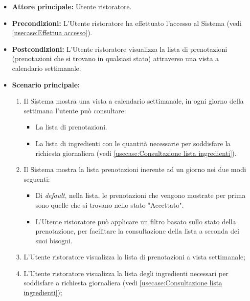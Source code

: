 \label{usecase:Consultazione lista prenotazioni}
\begin{itemize}
	\item \textbf{Attore principale:} Utente ristoratore.

	\item \textbf{Precondizioni:} L'Utente ristoratore ha effettuato l'accesso al Sistema (vedi \autoref{usecase:Effettua accesso}).

	\item \textbf{Postcondizioni:} L'Utente ristoratore visualizza la lista di prenotazioni (prenotazioni che si trovano in qualsiasi stato) attraverso una vista a calendario settimanale.

	\item \textbf{Scenario principale:}
	      \begin{enumerate}
		      \item Il Sistema mostra una vista a calendario settimanale, in ogni giorno della settimana l'utente può consultare:
		      \begin{itemize}
				\item La lista di prenotazioni.
				\item La lista di ingredienti con le quantità necessarie per soddisfare la richiesta giornaliera (vedi \autoref{usecase:Consultazione lista ingredienti}).
			  \end{itemize} 

		      \item Il Sistema mostra la lista prenotazioni inerente ad un giorno nei due modi seguenti:
		      \begin{itemize}
				\item Di \textit{default}, nella lista, le prenotazioni che vengono mostrate per prima sono quelle che si trovano nello stato "Accettato".
				\item L'Utente ristoratore può applicare un filtro basato sullo stato della prenotazione, per facilitare la consultazione della lista a seconda dei suoi bisogni.
			  \end{itemize}

		      \item L'Utente ristoratore visualizza la lista di prenotazioni a vista settimanale;

		      \item L'Utente ristoratore visualizza la lista degli ingredienti necessari per soddisfare a richiesta giornaliera (vedi \autoref{usecase:Consultazione lista ingredienti});
	      \end{enumerate}
\end{itemize}



